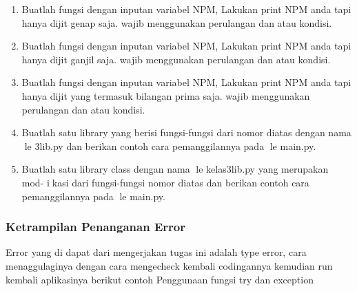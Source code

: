 \begin{enumerate}
    \item Buatlah fungsi dengan inputan variabel NPM, Lakukan print NPM anda tapi
    hanya dijit genap saja. wajib menggunakan perulangan dan atau kondisi.
    

    \item Buatlah fungsi dengan inputan variabel NPM, Lakukan print NPM anda tapi
    hanya dijit ganjil saja. wajib menggunakan perulangan dan atau kondisi.
    

    \item Buatlah fungsi dengan inputan variabel NPM, Lakukan print NPM anda tapi
    hanya dijit yang termasuk bilangan prima saja. wajib menggunakan perulangan
    dan atau kondisi.
    

    \item Buatlah satu library yang berisi fungsi-fungsi dari nomor diatas dengan nama
    le 3lib.py dan berikan contoh cara pemanggilannya pada le main.py.
    

    \item Buatlah satu library class dengan nama le kelas3lib.py yang merupakan mod-
    ikasi dari fungsi-fungsi nomor diatas dan berikan contoh cara pemanggilannya
    pada le main.py.
    
    
\end{enumerate}
\subsubsection{Ketrampilan Penanganan Error}
Error yang di dapat dari mengerjakan tugas ini adalah type error, cara menaggulaginya dengan cara mengecheck kembali codingannya
kemudian run kembali aplikasinya
berikut contoh Penggunaan fungsi try dan exception





